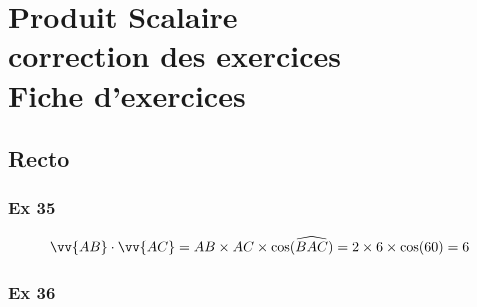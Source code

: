 \documentclass[12pt,a4paper]{book}
\begin{document}
\graphicspath{{images/}}
\setcounter{chapter}{2}
\chapter[Correction des exercices]{Produit Scalaire \\ correction des exercices\\ Fiche d'exercices}
\thispagestyle{fancy}

\section*{Recto}

\subsection*{Ex 35}

$$\vv{AB}\cdot\vv{AC}=AB\times AC\times\cos(\widehat{BAC})=2\times6\times\cos(60)=6$$

\subsection*{Ex 36}
\end{document}
